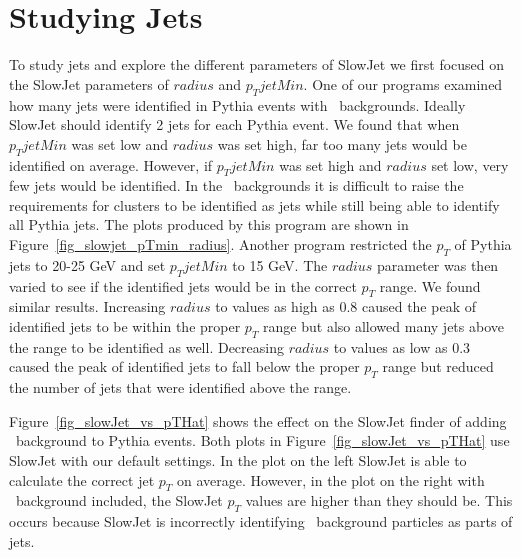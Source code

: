 \documentclass[11pt]{article}
\begin{document}
\section{Studying Jets}
%
%
To study jets and explore the different parameters of SlowJet we first focused on the SlowJet parameters of $radius$ and $p_TjetMin$. One of our programs examined how many jets were identified in Pythia events with \trento\ backgrounds. Ideally SlowJet should identify 2 jets for each Pythia event. We found that when $p_TjetMin$ was set low and $radius$ was set high, far too many jets would be identified on average. However, if $p_TjetMin$ was set high and $radius$ set low, very few jets would be identified. In the \trento\ backgrounds it is difficult to raise the requirements for clusters to be identified as jets while still being able to identify all Pythia jets. The plots produced by this program are shown in Figure~\ref{fig_slowjet_pTmin_radius}. Another program restricted the $p_T$ of Pythia jets to 20-25 GeV and set $p_TjetMin$ to 15 GeV. The $radius$ parameter was then varied to see if the identified jets would be in the correct $p_T$ range. We found similar results. Increasing $radius$ to values as high as 0.8 caused the peak of identified jets to be within the proper $p_T$ range but also allowed many jets above the range to be identified as well. Decreasing $radius$ to values as low as 0.3 caused the peak of identified jets to fall below the proper $p_T$ range but reduced the number of jets that were identified above the range.

Figure~\ref{fig_slowJet_vs_pTHat} shows the effect on the SlowJet finder of adding \trento\ background to Pythia events. Both plots in Figure~\ref{fig_slowJet_vs_pTHat} use SlowJet with our default settings. In the plot on the left SlowJet is able to calculate the correct jet $p_T$ on average. However, in the plot on the right with \trento\ background included, the SlowJet $p_T$ values are higher than they should be. This occurs because SlowJet is incorrectly identifying \trento\ background particles as parts of jets.
\end{document}

